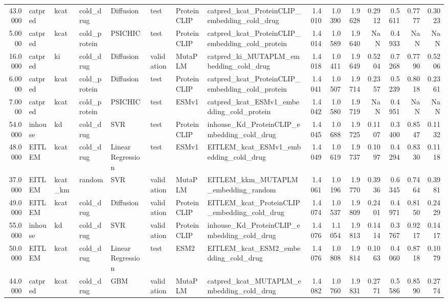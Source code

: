 \begin{tabular}{rlllllllrrrrrrr}
43.0000 & catpred & kcat & cold_drug & Diffusion & test & ProteinCLIP & catpred_kcat_ProteinCLIP_embedding_cold_drug & 1.4010 & 1.0390 & 1.9628 & 0.2912 & 0.5611 & 0.7777 & 0.3023 \\
5.0000 & catpred & kcat & cold_protein & PSICHIC & test & ProteinCLIP & catpred_kcat_ProteinCLIP_embedding_cold_protein & 1.4014 & 1.0589 & 1.9640 & NaN & 0.4933 & NaN & NaN \\
16.0000 & catpred & ki & cold_drug & Diffusion & validation & MutaPLM & catpred_ki_MUTAPLM_embedding_cold_drug & 1.4018 & 1.0411 & 1.9649 & 0.5204 & 0.7268 & 0.7790 & 0.5206 \\
6.0000 & catpred & kcat & cold_protein & Diffusion & test & ProteinCLIP & catpred_kcat_ProteinCLIP_embedding_cold_protein & 1.4041 & 1.0507 & 1.9714 & 0.2357 & 0.5239 & 0.8018 & 0.2361 \\
7.0000 & catpred & kcat & cold_protein & PSICHIC & test & ESMv1 & catpred_kcat_ESMv1_embedding_cold_protein & 1.4042 & 1.0580 & 1.9719 & NaN & 0.4951 & NaN & NaN \\
54.0000 & inhouse & kd & cold_drug & SVR & test & ProteinCLIP & inhouse_Kd_ProteinCLIP_embedding_cold_drug & 1.4045 & 1.0688 & 1.9725 & 0.1107 & 0.3400 & 0.8547 & 0.1132 \\
48.0000 & EITLEM & kcat & cold_drug & Linear Regression & test & ESMv1 & EITLEM_kcat_ESMv1_embedding_cold_drug & 1.4049 & 1.0619 & 1.9737 & 0.1097 & 0.4294 & 0.8330 & 0.1118 \\
37.0000 & EITLEM & kcat_km & random & SVR & validation & MutaPLM & EITLEM_kkm_MUTAPLM_embedding_random & 1.4061 & 1.0196 & 1.9770 & 0.3936 & 0.6345 & 0.7464 & 0.3981 \\
49.0000 & EITLEM & kcat & cold_drug & Diffusion & validation & ProteinCLIP & EITLEM_kcat_ProteinCLIP_embedding_cold_drug & 1.4074 & 1.0537 & 1.9809 & 0.2401 & 0.4971 & 0.8150 & 0.2429 \\
55.0000 & inhouse & kd & cold_drug & SVR & validation & ProteinCLIP & inhouse_Kd_ProteinCLIP_embedding_cold_drug & 1.4076 & 1.1054 & 1.9813 & 0.1414 & 0.3767 & 0.9217 & 0.1417 \\
50.0000 & EITLEM & kcat & cold_drug & Linear Regression & test & ESM2 & EITLEM_kcat_ESM2_embedding_cold_drug & 1.4076 & 1.0808 & 1.9814 & 0.1063 & 0.4060 & 0.8718 & 0.1079 \\
44.0000 & catpred & kcat & cold_drug & GBM & validation & MutaPLM & catpred_kcat_MUTAPLM_embedding_cold_drug & 1.4082 & 1.0760 & 1.9831 & 0.2771 & 0.5586 & 0.8590 & 0.2774 \\

\end{tabular}
